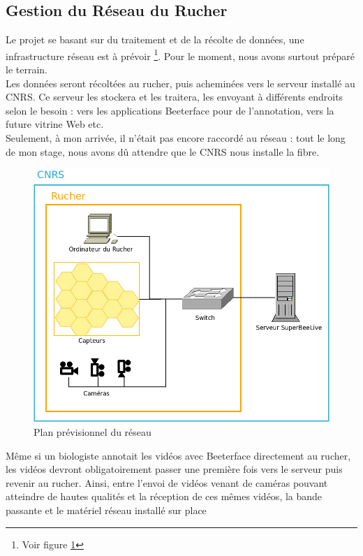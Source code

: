\documentclass[11pt,french,a4paper]{report}
\begin{document}
        \subsection{Gestion du Réseau du Rucher}
Le projet se basant sur du traitement et de la récolte de données, une infrastructure réseau est à prévoir 
\footnote{Voir figure \ref{plan_res}}. Pour le moment, nous avons surtout préparé le terrain.  \\
Les données seront récoltées au rucher, puis acheminées vers le serveur installé au CNRS. Ce serveur les stockera et les traitera, 
les envoyant à différents endroits selon le besoin : vers les applications Beeterface pour de l'annotation, vers la future vitrine Web
etc. \\
Seulement, à mon arrivée, il n'était pas encore raccordé au réseau : tout le long de mon stage,  nous avons dû attendre que
le CNRS nous installe la fibre. \\
\begin{figure}[!h]
    \centering
    \includegraphics[scale=0.3]{../images/dia/plan_reseau.png}
    \caption{Plan prévisionnel du réseau}
    \label{plan_res}
\end{figure}
Même si un biologiste annotait les vidéos avec Beeterface directement au rucher, les vidéos devront obligatoirement passer une première 
fois vers le serveur puis revenir au rucher. Ainsi, entre l'envoi de vidéos venant de caméras pouvant atteindre de hautes
qualités et la réception de ces mêmes vidéos, la bande passante et le matériel réseau installé sur place 
\end{document}

